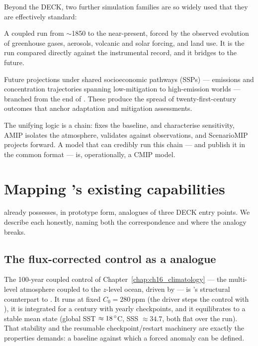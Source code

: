 Beyond the DECK, two further simulation families are so widely used that they are
effectively standard:

\begin{description}[leftmargin=1.5em,style=nextline]
\item[\code{historical}.]
  A coupled run from $\sim$1850 to the near-present, forced by the observed
  evolution of greenhouse gases, aerosols, volcanic and solar forcing, and land
  use. It is the run compared directly against the instrumental record, and it
  bridges  to the future.
\item[ScenarioMIP.]
  Future projections under shared socioeconomic pathways (SSPs) --- emissions and
  concentration trajectories spanning low-mitigation to high-emission worlds
  --- branched from the end of . These produce the spread of
  twenty-first-century outcomes that anchor adaptation and mitigation assessments.
\end{description}

The unifying logic is a chain:  fixes the baseline,
 and  characterise sensitivity, AMIP isolates the
atmosphere,  validates against observations, and ScenarioMIP
projects forward. A model that can credibly run this chain --- and publish it in
the common format --- is, operationally, a CMIP model.

\section{Mapping \model{}'s existing capabilities}\label{sec:c20_map}

\model{} already possesses, in prototype form, analogues of three DECK entry
points. We describe each honestly, naming both the correspondence and where the
analogy breaks.

\subsection{The flux-corrected control as a  analogue}\label{sec:c20_picontrol}

The 100-year coupled control of Chapter~\ref{chap:ch16_climatology}
--- the multi-level \dino{} atmosphere coupled to the $z$-level ocean,
driven by  --- is \model{}'s structural counterpart to .
It runs at fixed $C_0=280\,$ppm (the driver steps the control with
), it is integrated for a century with yearly checkpoints,
and it equilibrates to a stable mean state (global SST $\approx 18\,^{\circ}$C,
SSS $\approx 34.7$, both flat over the run). That stability and the resumable
checkpoint/restart machinery are exactly the properties  demands:
a baseline against which a forced anomaly can be defined.

